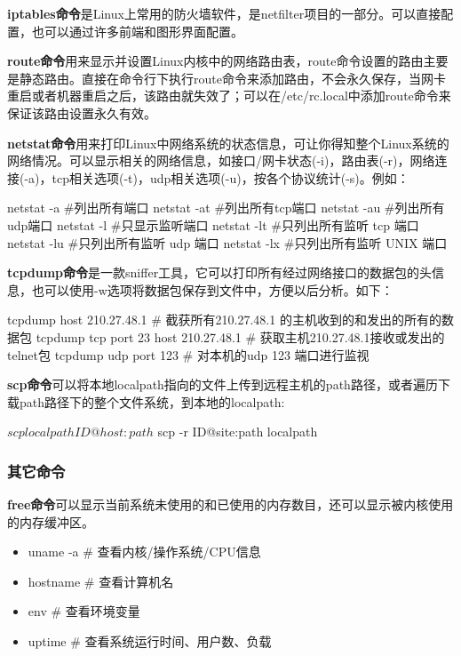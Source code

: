 \textbf{iptables命令}是Linux上常用的防火墙软件，是netfilter项目的一部分。可以直接配置，也可以通过许多前端和图形界面配置。 

\textbf{route命令}用来显示并设置Linux内核中的网络路由表，route命令设置的路由主要是静态路由。直接在命令行下执行route命令来添加路由，不会永久保存，当网卡重启或者机器重启之后，该路由就失效了；可以在/etc/rc.local中添加route命令来保证该路由设置永久有效。

\textbf{netstat命令}用来打印Linux中网络系统的状态信息，可让你得知整个Linux系统的网络情况。可以显示相关的网络信息，如接口/网卡状态(-i)，路由表(-r)，网络连接(-a)，tcp相关选项(-t)，udp相关选项(-u)，按各个协议统计(-s)。例如：

\begin{Code}
netstat -a #列出所有端口 
netstat -at #列出所有tcp端口 
netstat -au #列出所有udp端口 
netstat -l #只显示监听端口 
netstat -lt #只列出所有监听 tcp 端口 
netstat -lu #只列出所有监听 udp 端口 
netstat -lx #只列出所有监听 UNIX 端口
\end{Code}

\textbf{tcpdump命令}是一款sniffer工具，它可以打印所有经过网络接口的数据包的头信息，也可以使用-w选项将数据包保存到文件中，方便以后分析。如下：

\begin{Code}
tcpdump host 210.27.48.1                # 截获所有210.27.48.1 的主机收到的和发出的所有的数据包
tcpdump tcp port 23 host 210.27.48.1    # 获取主机210.27.48.1接收或发出的telnet包
tcpdump udp port 123                    # 对本机的udp 123 端口进行监视
\end{Code}

\textbf{scp命令}可以将本地localpath指向的文件上传到远程主机的path路径，或者遍历下载path路径下的整个文件系统，到本地的localpath:

\begin{Code}
$ scp localpath ID@host:path
$ scp -r ID@site:path localpath
\end{Code}

\subsubsection{其它命令} 

\textbf{free命令}可以显示当前系统未使用的和已使用的内存数目，还可以显示被内核使用的内存缓冲区。
\begin{itemize}
\item uname -a   \# 查看内核/操作系统/CPU信息
\item hostname   \# 查看计算机名
\item env        \# 查看环境变量
\item uptime     \# 查看系统运行时间、用户数、负载
\end{itemize}

